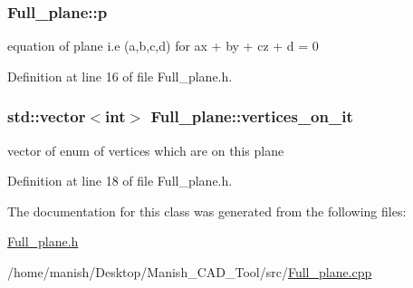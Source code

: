 \subsubsection[{\texorpdfstring{p}{p}}]{ Full\+\_\+plane\+::p}\hypertarget{class_full__plane_ad65bd61131d3c78d146592919a43fc3e}{}\label{class_full__plane_ad65bd61131d3c78d146592919a43fc3e}


equation of plane i.\+e (a,b,c,d) for ax + by + cz + d = 0 



Definition at line 16 of file Full\+\_\+plane.\+h.

\subsubsection[{\texorpdfstring{vertices\+\_\+on\+\_\+it}{vertices_on_it}}]{\setlength{\rightskip}{0pt plus 5cm}std\+::vector$<$int$>$ Full\+\_\+plane\+::vertices\+\_\+on\+\_\+it}\hypertarget{class_full__plane_a0b93d1b5a72f3fb83808edfce3bbcd1b}{}\label{class_full__plane_a0b93d1b5a72f3fb83808edfce3bbcd1b}


vector of enum of vertices which are on this plane 



Definition at line 18 of file Full\+\_\+plane.\+h.



The documentation for this class was generated from the following files\+:\begin{DoxyCompactItemize}
\item 
\hyperlink{_full__plane_8h}{Full\+\_\+plane.\+h}\item 
/home/manish/\+Desktop/\+Manish\+\_\+\+C\+A\+D\+\_\+\+Tool/src/\hyperlink{_full__plane_8cpp}{Full\+\_\+plane.\+cpp}\end{DoxyCompactItemize}
